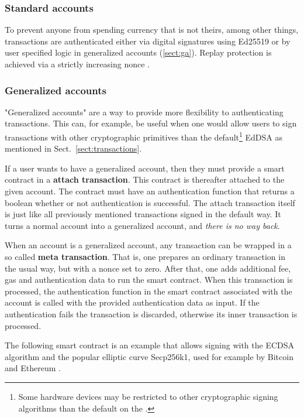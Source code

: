 \subsubsection{Standard accounts}
To prevent anyone from spending currency that is not theirs, among other
things, transactions are authenticated either via digital signatures using
Ed25519 \cite{bernstein2012high, bernstein2006curve25519} or by user specified
logic in generalized accounts (\ref{sect:ga}).
Replay protection is achieved via a strictly increasing nonce \cite{Syverson}.
\subsubsection{Generalized accounts}

"Generalized accounts" are a way to provide more flexibility to authenticating
transactions. This can, for example, be useful when one would allow users to
sign transactions with other cryptographic primitives than the
default\footnote{Some hardware devices may be restricted to other cryptographic
signing algorithms than the default on the \blockchain.} EdDSA as mentioned in
Sect.\ \ref{sect:transactions}.

If a user wants to have a generalized account, then they must
provide a smart contract in a \textbf{attach transaction}. This
contract is thereafter attached to the given account. The contract
must have an authentication function that returns a boolean whether or
not authentication is successful. The attach transaction itself is
just like all previously mentioned transactions signed in the default
way. It turns a normal account into a generalized account, and
\textit{there is no way back}.

When an account is a generalized account, any transaction can
be wrapped in a so called \textbf{meta transaction}. That is, one
prepares an ordinary transaction in the usual way, but with a nonce set to
zero. After that, one adds additional fee, gas and authentication data to
run the smart contract. When this transaction is processed, the
authentication function in the smart contract associated with the
account is called with the provided authentication data as input. If
the authentication fails the transaction is discarded, otherwise its
inner transaction is processed.

The following smart contract is an example that allows signing with
the ECDSA algorithm \cite{johnson2001elliptic} and the popular elliptic curve
Secp256k1, used for example by Bitcoin and Ethereum
\cite{bos2014elliptic, mayer2016ecdsa}.


